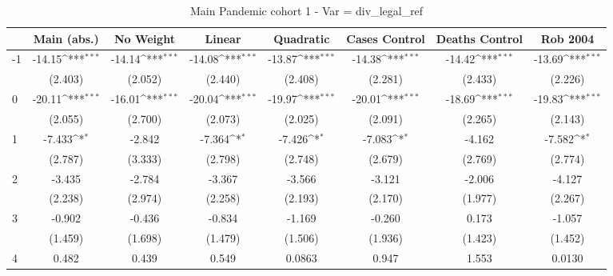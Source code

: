 \documentclass{article}
\begin{document}
{
\def\sym#1{\ifmmode^{#1}\else\(^{#1}\)\fi}
\begin{longtable}{l*{7}{c}}
\caption{Main Pandemic cohort 1 - Var = div\_legal\_ref}\\
\hline\hline\endfirsthead\hline\endhead\hline\endfoot\endlastfoot
                &\multicolumn{1}{c}{Main (abs.)}&\multicolumn{1}{c}{No Weight}&\multicolumn{1}{c}{Linear}&\multicolumn{1}{c}{Quadratic}&\multicolumn{1}{c}{Cases Control}&\multicolumn{1}{c}{Deaths Control}&\multicolumn{1}{c}{Rob 2004}\\
\hline
-1              &   -14.15\sym{***}&   -14.14\sym{***}&   -14.08\sym{***}&   -13.87\sym{***}&   -14.38\sym{***}&   -14.42\sym{***}&   -13.69\sym{***}\\
                &  (2.403)         &  (2.052)         &  (2.440)         &  (2.408)         &  (2.281)         &  (2.433)         &  (2.226)         \\
0               &   -20.11\sym{***}&   -16.01\sym{***}&   -20.04\sym{***}&   -19.97\sym{***}&   -20.01\sym{***}&   -18.69\sym{***}&   -19.83\sym{***}\\
                &  (2.055)         &  (2.700)         &  (2.073)         &  (2.025)         &  (2.091)         &  (2.265)         &  (2.143)         \\
1               &   -7.433\sym{*}  &   -2.842         &   -7.364\sym{*}  &   -7.426\sym{*}  &   -7.083\sym{*}  &   -4.162         &   -7.582\sym{*}  \\
                &  (2.787)         &  (3.333)         &  (2.798)         &  (2.748)         &  (2.679)         &  (2.769)         &  (2.774)         \\
2               &   -3.435         &   -2.784         &   -3.367         &   -3.566         &   -3.121         &   -2.006         &   -4.127         \\
                &  (2.238)         &  (2.974)         &  (2.258)         &  (2.193)         &  (2.170)         &  (1.977)         &  (2.267)         \\
3               &   -0.902         &   -0.436         &   -0.834         &   -1.169         &   -0.260         &    0.173         &   -1.057         \\
                &  (1.459)         &  (1.698)         &  (1.479)         &  (1.506)         &  (1.936)         &  (1.423)         &  (1.452)         \\
4               &    0.482         &    0.439         &    0.549         &   0.0863         &    0.947         &    1.553         &   0.0130         \\

\end{longtable}}
\end{document}
